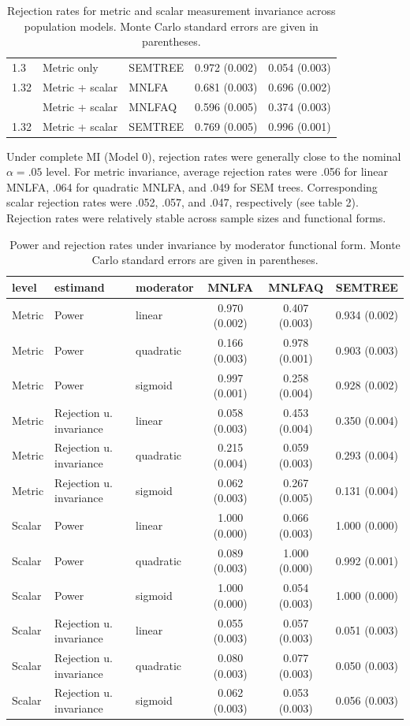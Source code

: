 \documentclass[
  man,
  floatsintext]{apa7}
\begin{document}
\begin{table}[H]
\begin{tabular}{lllcc}
1.3 & Metric only & SEMTREE & 0.972 (0.002) & 0.054 (0.003)\\
1.32 & Metric + scalar & MNLFA & 0.681 (0.003) & 0.696 (0.002)\\
\addlinespace
1.32 & Metric + scalar & MNLFAQ & 0.596 (0.005) & 0.374 (0.003)\\
1.32 & Metric + scalar & SEMTREE & 0.769 (0.005) & 0.996 (0.001)\\
\bottomrule
\end{tabular}\caption{Rejection rates for metric and scalar measurement invariance across population models. Monte Carlo standard errors are given in parentheses.}
\end{table}

Under complete MI (Model 0), rejection rates were generally close to the
nominal \(\alpha=.05\) level. For metric invariance, average rejection
rates were .056 for linear MNLFA, .064 for quadratic MNLFA, and .049 for
SEM trees. Corresponding scalar rejection rates were .052, .057, and
.047, respectively (see table 2). Rejection rates were relatively stable
across sample sizes and functional forms.

\begin{table}[H]
\centering

\begin{tabular}{lllccc}
\toprule
level & estimand & moderator & MNLFA & MNLFAQ & SEMTREE\\
\midrule
Metric & Power & linear & 0.970 (0.002) & 0.407 (0.003) & 0.934 (0.002)\\
Metric & Power & quadratic & 0.166 (0.003) & 0.978 (0.001) & 0.903 (0.003)\\
Metric & Power & sigmoid & 0.997 (0.001) & 0.258 (0.004) & 0.928 (0.002)\\
Metric & Rejection u. invariance & linear & 0.058 (0.003) & 0.453 (0.004) & 0.350 (0.004)\\
Metric & Rejection u. invariance & quadratic & 0.215 (0.004) & 0.059 (0.003) & 0.293 (0.004)\\
\addlinespace
Metric & Rejection u. invariance & sigmoid & 0.062 (0.003) & 0.267 (0.005) & 0.131 (0.004)\\
Scalar & Power & linear & 1.000 (0.000) & 0.066 (0.003) & 1.000 (0.000)\\
Scalar & Power & quadratic & 0.089 (0.003) & 1.000 (0.000) & 0.992 (0.001)\\
Scalar & Power & sigmoid & 1.000 (0.000) & 0.054 (0.003) & 1.000 (0.000)\\
Scalar & Rejection u. invariance & linear & 0.055 (0.003) & 0.057 (0.003) & 0.051 (0.003)\\
\addlinespace
Scalar & Rejection u. invariance & quadratic & 0.080 (0.003) & 0.077 (0.003) & 0.050 (0.003)\\
Scalar & Rejection u. invariance & sigmoid & 0.062 (0.003) & 0.053 (0.003) & 0.056 (0.003)\\
\bottomrule
\end{tabular}\caption{Power and rejection rates under invariance by moderator functional form. Monte Carlo standard errors are given in parentheses.}
\end{table}
\end{document}
